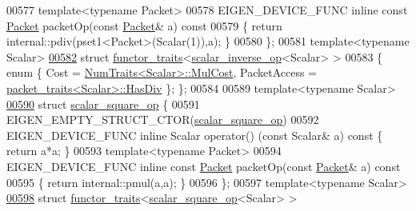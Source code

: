 \begin{DoxyCode}
00577   \textcolor{keyword}{template}<\textcolor{keyword}{typename} Packet>
00578   EIGEN\_DEVICE\_FUNC \textcolor{keyword}{inline} \textcolor{keyword}{const} \hyperlink{union_eigen_1_1internal_1_1_packet}{Packet} packetOp(\textcolor{keyword}{const} \hyperlink{union_eigen_1_1internal_1_1_packet}{Packet}& a)\textcolor{keyword}{ const}
00579 \textcolor{keyword}{  }\{ \textcolor{keywordflow}{return} internal::pdiv(pset1<Packet>(Scalar(1)),a); \}
00580 \};
00581 \textcolor{keyword}{template}<\textcolor{keyword}{typename} Scalar>
\hyperlink{struct_eigen_1_1internal_1_1functor__traits_3_01scalar__inverse__op_3_01_scalar_01_4_01_4}{00582} \textcolor{keyword}{struct }\hyperlink{struct_eigen_1_1internal_1_1functor__traits}{functor\_traits}<\hyperlink{struct_eigen_1_1internal_1_1scalar__inverse__op}{scalar\_inverse\_op}<Scalar> >
00583 \{ \textcolor{keyword}{enum} \{ Cost = \hyperlink{group___core___module_struct_eigen_1_1_num_traits}{NumTraits<Scalar>::MulCost}, PacketAccess = 
      \hyperlink{struct_eigen_1_1internal_1_1packet__traits}{packet\_traits<Scalar>::HasDiv} \}; \};
00584 
00589 \textcolor{keyword}{template}<\textcolor{keyword}{typename} Scalar>
\hyperlink{struct_eigen_1_1internal_1_1scalar__square__op}{00590} \textcolor{keyword}{struct }\hyperlink{struct_eigen_1_1internal_1_1scalar__square__op}{scalar\_square\_op} \{
00591   EIGEN\_EMPTY\_STRUCT\_CTOR(\hyperlink{struct_eigen_1_1internal_1_1scalar__square__op}{scalar\_square\_op})
00592   EIGEN\_DEVICE\_FUNC \textcolor{keyword}{inline} Scalar operator() (\textcolor{keyword}{const} Scalar& a)\textcolor{keyword}{ const }\{ \textcolor{keywordflow}{return} a*a; \}
00593   \textcolor{keyword}{template}<\textcolor{keyword}{typename} Packet>
00594   EIGEN\_DEVICE\_FUNC \textcolor{keyword}{inline} \textcolor{keyword}{const} \hyperlink{union_eigen_1_1internal_1_1_packet}{Packet} packetOp(\textcolor{keyword}{const} \hyperlink{union_eigen_1_1internal_1_1_packet}{Packet}& a)\textcolor{keyword}{ const}
00595 \textcolor{keyword}{  }\{ \textcolor{keywordflow}{return} internal::pmul(a,a); \}
00596 \};
00597 \textcolor{keyword}{template}<\textcolor{keyword}{typename} Scalar>
\hyperlink{struct_eigen_1_1internal_1_1functor__traits_3_01scalar__square__op_3_01_scalar_01_4_01_4}{00598} \textcolor{keyword}{struct }\hyperlink{struct_eigen_1_1internal_1_1functor__traits}{functor\_traits}<\hyperlink{struct_eigen_1_1internal_1_1scalar__square__op}{scalar\_square\_op}<Scalar> >

\end{DoxyCode}
